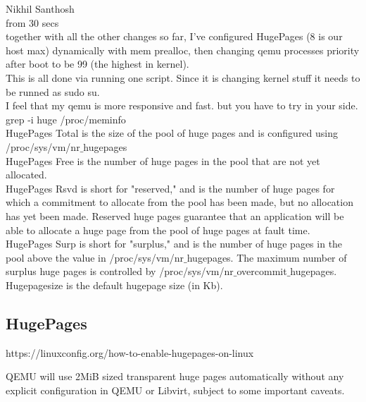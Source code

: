 \documentclass[11pt, a4paper, oneside]{article}
\theoremstyle{definition}
\begin{document}
Nikhil Santhosh\\
from 30 secs\\

together with all the other changes so far, I've configured HugePages (8 is our host max) dynamically with mem prealloc, then changing qemu processes priority after boot to be 99 (the highest in kernel).\\

This is all done via running one script. Since it is changing kernel stuff it needs to be runned as sudo su.\\

I feel that my qemu is more responsive and fast. but you have to try in your side.\\


grep -i huge /proc/meminfo\\

HugePages Total is the size of the pool of huge pages and is configured 
				using /proc/sys/vm/nr$\_$hugepages\\
HugePages Free  is the number of huge pages in the pool that are not yet
                allocated.\\
HugePages Rsvd  is short for "reserved," and is the number of huge pages for
                which a commitment to allocate from the pool has been made,
                but no allocation has yet been made.  Reserved huge pages
                guarantee that an application will be able to allocate a
                huge page from the pool of huge pages at fault time.\\
HugePages Surp  is short for "surplus," and is the number of huge pages in
                the pool above the value in /proc/sys/vm/nr$\_$hugepages. The
                maximum number of surplus huge pages is controlled by
                /proc/sys/vm/nr$\_$overcommit$\_$hugepages.\\
Hugepagesize    is the default hugepage size (in Kb).\\



\subsection{HugePages}

https://linuxconfig.org/how-to-enable-hugepages-on-linux

QEMU will use 2MiB sized transparent huge pages automatically without any explicit configuration in QEMU or Libvirt, subject to some important caveats.\\
\end{document}
